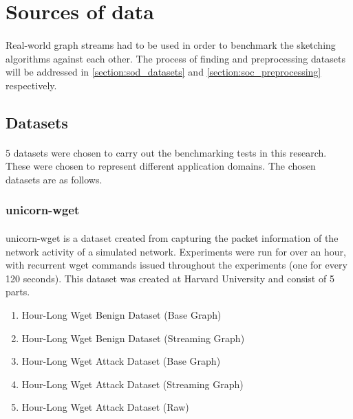 \section{Sources of data}
\label{section:design_sources_of_data}

\paragraph{}
Real-world graph streams had to be used in order to benchmark the sketching algorithms against each other.  The process of finding and preprocessing datasets will be addressed in \autoref{section:sod_datasets} and \autoref{section:soc_preprocessing} respectively.

\subsection{Datasets}
\label{section:sod_datasets}

\paragraph{}
5 datasets were chosen to carry out the benchmarking tests in this research. These were chosen to represent different application domains. The chosen datasets are as follows.

\subsubsection{unicorn-wget\cite{DVN/5H4TDI_2018}}

\paragraph{}
unicorn-wget is a dataset created from capturing the packet information of the network activity of a simulated network. Experiments were run for over an hour, with recurrent wget commands issued throughout the experiments (one for every 120 seconds). This dataset was created at Harvard University and consist of 5 parts.

\begin{enumerate}
    \item Hour-Long Wget Benign Dataset (Base Graph)
    \item Hour-Long Wget Benign Dataset (Streaming Graph)
    \item Hour-Long Wget Attack Dataset (Base Graph)
    \item Hour-Long Wget Attack Dataset (Streaming Graph)
    \item Hour-Long Wget Attack Dataset (Raw)
\end{enumerate}

